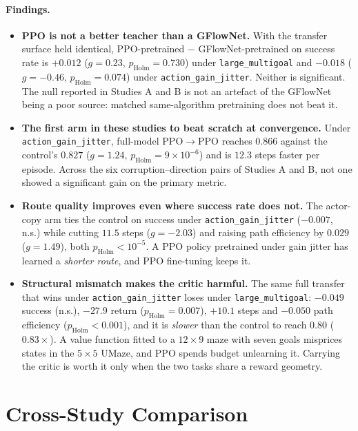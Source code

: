 \paragraph{Findings.}
\begin{itemize}
  \item \textbf{PPO is not a better teacher than a GFlowNet.} With the transfer surface held identical, PPO-pretrained $-$ GFlowNet-pretrained on success rate is $+0.012$ ($g=0.23$, $p_{\mathrm{Holm}}=0.730$) under \texttt{large\_multigoal} and $-0.018$ ($g=-0.46$, $p_{\mathrm{Holm}}=0.074$) under \texttt{action\_gain\_jitter}. Neither is significant. The null reported in Studies A and B is not an artefact of the GFlowNet being a poor source: matched same-algorithm pretraining does not beat it.
  \item \textbf{The first arm in these studies to beat scratch at convergence.} Under \texttt{action\_gain\_jitter}, full-model PPO$\rightarrow$PPO reaches $0.866$ against the control's $0.827$ ($g=1.24$, $p_{\mathrm{Holm}}=9\times10^{-6}$) and is $12.3$ steps faster per episode. Across the six corruption--direction pairs of Studies A and B, not one showed a significant gain on the primary metric.
  \item \textbf{Route quality improves even where success rate does not.} The actor-copy arm ties the control on success under \texttt{action\_gain\_jitter} ($-0.007$, n.s.) while cutting $11.5$ steps ($g=-2.03$) and raising path efficiency by $0.029$ ($g=1.49$), both $p_{\mathrm{Holm}}<10^{-5}$. A PPO policy pretrained under gain jitter has learned a \emph{shorter route}, and PPO fine-tuning keeps it.
  \item \textbf{Structural mismatch makes the critic harmful.} The same full transfer that wins under \texttt{action\_gain\_jitter} loses under \texttt{large\_multigoal}: $-0.049$ success (n.s.), $-27.9$ return ($p_{\mathrm{Holm}}=0.007$), $+10.1$ steps and $-0.050$ path efficiency ($p_{\mathrm{Holm}}<0.001$), and it is \emph{slower} than the control to reach $0.80$ ($0.83\times$). A value function fitted to a $12\times9$ maze with seven goals misprices states in the $5\times5$ UMaze, and PPO spends budget unlearning it. Carrying the critic is worth it only when the two tasks share a reward geometry.
\end{itemize}

\clearpage
\section{Cross-Study Comparison}

